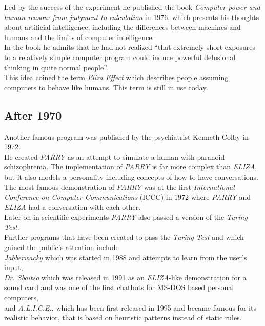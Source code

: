 Led by the success of the experiment he published the book \emph{Computer power and human reason: from judgment to calculation} in 1976,
which presents his thoughts about artificial intelligence,
including the differences between machines and humans and the limits of computer intelligence.
\\
In the book he admits that he had not realized ``that extremely short exposures to a relatively simple computer program could induce powerful delusional thinking in quite normal people''\cite{bbcnowthen}.
\\
This idea coined the term \emph{Eliza Effect} which describes people assuming computers to behave like humans. This term is still in use today.


\subsection{After 1970}

Another famous program was published by the psychiatrist Kenneth Colby in 1972.
\\
He created \emph{PARRY} as an attempt to simulate a human with paranoid schizophrenia.
The implementation of \emph{PARRY} is far more complex than \emph{ELIZA},
but it also models a personality including concepts of how to have conversations.
\\
The most famous demonstration of \emph{PARRY} was at the first \emph{International Conference on Computer Communications} (ICCC) in 1972 where \emph{PARRY} and \emph{ELIZA} had a conversation with each other\cite{internethistory}.
\\
Later on in scientific experiments \emph{PARRY} also passed a version of the \emph{Turing Test}.
\\

Further programs that have been created to pass the \emph{Turing Test} and which gained the public's attention include
\\
\emph{Jabberwacky} which was started in 1988 and attempts to learn from the user's input\cite{jabberwacky},
\\
\emph{Dr. Sbaitso} which was released in 1991 as an \emph{ELIZA}-like demonstration for a sound card and was one of the first chatbots for MS-DOS based personal computers\cite{pcmag},
\\
and \emph{A.L.I.C.E.}, which has been first released in 1995 and became famous for its realistic behavior, that is based on heuristic patterns instead of static rules\cite{approximatinglife}.
\\

